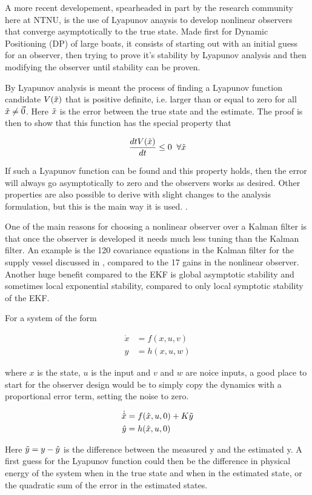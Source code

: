 A more recent developement, spearheaded in part by the research community here at NTNU, is the use of Lyapunov anaysis to develop nonlinear observers that converge asymptotically to the true state\cite{PassiveFossen}. Made first for Dynamic Positioning (DP) of large boats, it consists of starting out with an initial guess for an observer, then trying to prove it's stability by Lyapunov analysis and then modifying the observer until stability can be proven. 

By Lyapunov analysis\cite{Lyapunov} is meant the process of finding a Lyapunov function candidate $V(\Tilde{x})$ that is positive definite, i.e. larger than or equal to zero for all $\Tilde{x}\neq \Vec{0}$. Here $\Tilde{x}$ is the error between the true state and the estimate. The proof is then to show that this function has the special property that

\begin{equation}
    \frac{dt V(\Tilde{x})}{dt} \leq 0 \;\; \forall \hat{x}
\end{equation}

If such a Lyapunov function can be found and this property holds, then the error will always go asymptotically to zero and the observers works as desired. Other properties are also possible to derive with slight changes to the analysis formulation, but this is the main way it is used.  . 

One of the main reasons for choosing a nonlinear observer over a Kalman filter is that once the observer is developed it needs much less tuning than the Kalman filter. An example is the 120 covariance equations in the Kalman filter for the supply vessel discussed in \cite{PassiveFossen}, compared to the 17 gains in the nonlinear observer. Another huge benefit compared to the EKF is global asymptotic stability and sometimes local exponential stability, compared to only local symptotic stability of the EKF. 

For a system of the form 

\begin{align}
    \Dot{x} &= f(x,u,v) \\
    y &= h(x,u,w)
\end{align}

where $x$ is the state, $u$ is the input and $v$ and $w$ are noice inputs, a good place to start for the observer design would be to simply copy the dynamics with a proportional error term, setting the noise to zero.

\begin{align}
    \Dot{\hat{x}} &= f(\hat{x}, u, 0) + K\Tilde{y} \\
    \hat{y} &= h(\hat{x}, u, 0)
\end{align}

Here $\Tilde{y} = y -  \hat{y}$ is the difference between the measured y and the estimated y. A first guess for the Lyapunov function could then be the difference in physical energy of the system when in the true state and when in the estimated state, or the quadratic sum of the error in the estimated states. 